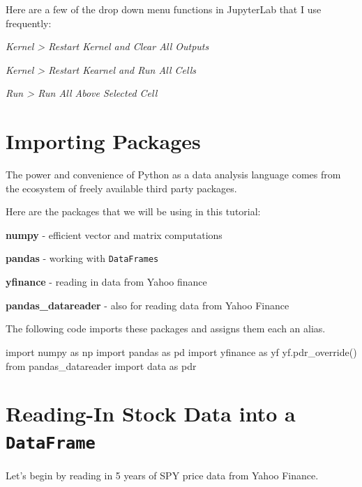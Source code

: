 \documentclass[
  letterpaper,
  DIV=11,
  numbers=noendperiod]{scrreprt}
\newenvironment{Shaded}{\begin{snugshade}}{\end{snugshade}}
\newcommand{\ImportTok}[1]{\textcolor[rgb]{0.00,0.46,0.62}{#1}}
\newcommand{\NormalTok}[1]{\textcolor[rgb]{0.00,0.23,0.31}{#1}}
\begin{document}
Here are a few of the drop down menu functions in JupyterLab that I use
frequently:

\emph{Kernel \textgreater{} Restart Kernel and Clear All Outputs}

\emph{Kernel \textgreater{} Restart Kearnel and Run All Cells}

\emph{Run \textgreater{} Run All Above Selected Cell}

\hypertarget{importing-packages}{%
\section{Importing Packages}\label{importing-packages}}

The power and convenience of Python as a data analysis language comes
from the ecosystem of freely available third party packages.

Here are the packages that we will be using in this tutorial:

\textbf{numpy} - efficient vector and matrix computations

\textbf{pandas} - working with \texttt{DataFrames}

\textbf{yfinance} - reading in data from Yahoo finance

\textbf{pandas\_datareader} - also for reading data from Yahoo Finance

The following code imports these packages and assigns them each an
alias.

\begin{Shaded}
\begin{Highlighting}[]
\ImportTok{import}\NormalTok{ numpy }\ImportTok{as}\NormalTok{ np}
\ImportTok{import}\NormalTok{ pandas }\ImportTok{as}\NormalTok{ pd}
\ImportTok{import}\NormalTok{ yfinance }\ImportTok{as}\NormalTok{ yf}
\NormalTok{yf.pdr\_override()}
\ImportTok{from}\NormalTok{ pandas\_datareader }\ImportTok{import}\NormalTok{ data }\ImportTok{as}\NormalTok{ pdr}
\end{Highlighting}
\end{Shaded}

\hypertarget{reading-in-stock-data-into-a-dataframe}{%
\section{\texorpdfstring{Reading-In Stock Data into a
\texttt{DataFrame}}{Reading-In Stock Data into a DataFrame}}\label{reading-in-stock-data-into-a-dataframe}}

Let's begin by reading in 5 years of SPY price data from Yahoo Finance.
\end{document}
